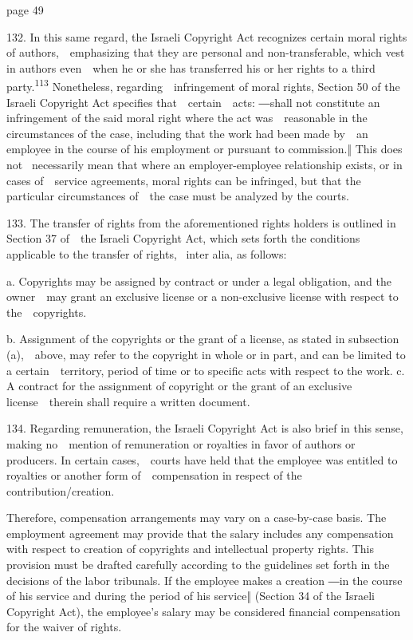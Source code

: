 \documentclass[
]{article}
\begin{document}
{page 49}

{132. }{In this same regard, the Israeli }{Copyright Act }{recognizes
certain moral rights of authors,~~emphasizing that they are personal and
non-transferable, which vest in authors even~~when he or she has
transferred his or her rights to a third party.}\textsuperscript{{113
}}{Nonetheless, regarding~~infringement of moral rights, Section 50 of
the Israeli }{Copyright Act }{specifies that~~certain~~ac}{ts: ―}{shall
not constitute an infringement of the said moral right where the act
was~~reasonable in the circumstances of the case}{, including }{that the
work had been made by~~an employee in the course of his employment or
pursuant to commission}{.‖ This does not }{~necessarily mean that where
an employer-employee relationship exists, or in cases of~~service
agreements, moral rights can be infringed, but that the particular
circumstances of~~the case must be analyzed by the courts.}

{133. }{The transfer of rights from the aforementioned rights holders is
outlined in Section 37 of~~the Israeli }{Copyright Act}{, which sets
forth the conditions applicable to the transfer of rights, }{~inter
alia}{, as follows:}

{a. Copyrights may be assigned by contract or under a legal obligation,
and the owner~~may grant an exclusive license or a non-exclusive license
with respect to the~~copyrights.}

{b. Assignment of the copyrights or the grant of a license, as stated in
subsection (a),~~above, may refer to the copyright in whole or in part,
and can be limited to a certain~~territory, period of time or to
specific acts with respect to the work. c. A contract for the assignment
of copyright or the grant of an exclusive license~~therein shall require
a written document.}

{134. }{Regarding remuneration, the Israeli }{Copyright Act }{is also
brief in this sense, making no~~mention of remuneration or royalties in
favor of authors or producers. In certain cases,~~courts have held that
the employee was entitled to royalties or another form of~~compensation
in respect of the contribution/creation.}

{Therefore, compensation arrangements may vary on a case-by-case basis.
The employment agreement may provide that the salary includes any
compensation with respect to creation of copyrights and intellectual
property rights. This provision must be drafted carefully according to
the guidelines set forth in the decisions of the labor tribunals. }{If
the employee makes a creation ―}{in the course of his service and during
the period of his service}{‖ (Sectio}{n 34 of the Israeli }{Copyright
Act}{), the employee's salary may }{be considered financial compensation
for the waiver of rights.}
\end{document}

